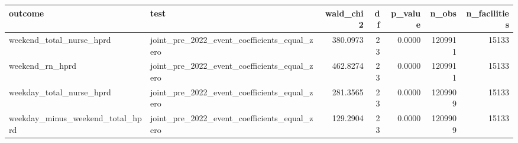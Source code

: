 \begin{tabular}{llrrrrr}
\toprule
outcome & test & wald_chi2 & df & p_value & n_obs & n_facilities \\
\midrule
weekend_total_nurse_hprd & joint_pre_2022_event_coefficients_equal_zero & 380.0973 & 23 & 0.0000 & 1209911 & 15133 \\
weekend_rn_hprd & joint_pre_2022_event_coefficients_equal_zero & 462.8274 & 23 & 0.0000 & 1209911 & 15133 \\
weekday_total_nurse_hprd & joint_pre_2022_event_coefficients_equal_zero & 281.3565 & 23 & 0.0000 & 1209909 & 15133 \\
weekday_minus_weekend_total_hprd & joint_pre_2022_event_coefficients_equal_zero & 129.2904 & 23 & 0.0000 & 1209909 & 15133 \\
\bottomrule
\end{tabular}
